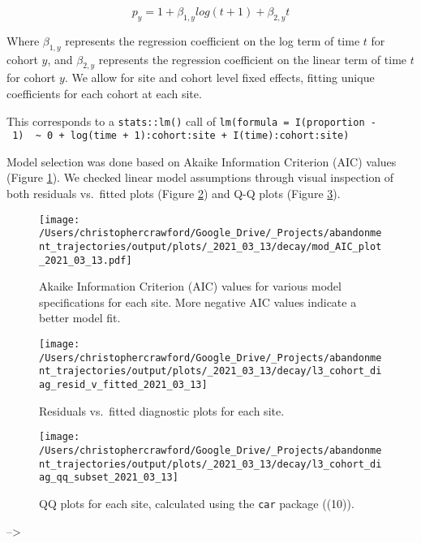 \documentclass[9pt,twoside,lineno]{pnas-new}
\begin{document}
\begin{equation}
p_{y} = 1 + \beta_{1,y} log(t + 1) + \beta_{2,y} t \label{eq:mod-spec-SI}
\end{equation}

Where \(\beta_{1,y}\) represents the regression coefficient on the log term of time \(t\) for cohort \(y\), and \(\beta_{2,y}\) represents the regression coefficient on the linear term of time \(t\) for cohort \(y\).
We allow for site and cohort level fixed effects, fitting unique coefficients for each cohort at each site.

This corresponds to a \texttt{stats::lm()} call of \texttt{lm(formula\ =\ I(proportion\ -\ 1)\ \ \textasciitilde{}\ 0\ +\ log(time\ +\ 1):cohort:site\ +\ I(time):cohort:site)}

Model selection was done based on Akaike Information Criterion (AIC) values (Figure \ref{fig:AIC}).
We checked linear model assumptions through visual inspection of both residuals vs.~fitted plots (Figure \ref{fig:diag-resid-fitted}) and Q-Q plots (Figure \ref{fig:diag-qq}).



\begin{figure}
\centering
\texttt{[image: /Users/christophercrawford/Google\_Drive/\_Projects/abandonment\_trajectories/output/plots/\_2021\_03\_13/decay/mod\_AIC\_plot\_2021\_03\_13.pdf]}
\caption{\label{fig:AIC}Akaike Information Criterion (AIC) values for various model specifications for each site. More negative AIC values indicate a better model fit.}
\end{figure}



\begin{figure}
\texttt{[image: /Users/christophercrawford/Google\_Drive/\_Projects/abandonment\_trajectories/output/plots/\_2021\_03\_13/decay/l3\_cohort\_diag\_resid\_v\_fitted\_2021\_03\_13]} \caption{Residuals vs.~fitted diagnostic plots for each site.}\label{fig:diag-resid-fitted}
\end{figure}



\begin{figure}
\texttt{[image: /Users/christophercrawford/Google\_Drive/\_Projects/abandonment\_trajectories/output/plots/\_2021\_03\_13/decay/l3\_cohort\_diag\_qq\_subset\_2021\_03\_13]} \caption{QQ plots for each site, calculated using the \texttt{car} package ((10)).}\label{fig:diag-qq}
\end{figure}

--\textgreater{}
\end{document}
